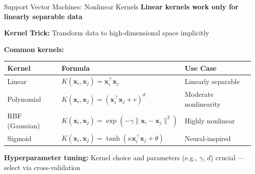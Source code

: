 \documentclass[11pt]{beamer}
\begin{document}
\begin{frame}[fragile]{Support Vector Machines: Nonlinear Kernels}
	\textbf{Linear kernels work only for linearly separable data}

	\vspace{0.2cm}

	\textbf{Kernel Trick:} Transform data to high-dimensional space implicitly \citep[pp. 75]{raschka2019PythonMachineLearning}

	\vspace{0.2cm}

	\textbf{Common kernels:}
	\begin{table}
		\small
		\begin{tabular}{|l|l|l|}
			\hline
			\textbf{Kernel} & \textbf{Formula}                                                                        & \textbf{Use Case}     \\
			\hline
			Linear          & $K(\mathbf{x}_i, \mathbf{x}_j) = \mathbf{x}_i^\top \mathbf{x}_j$                        & Linearly separable    \\
			\hline
			Polynomial      & $K(\mathbf{x}_i, \mathbf{x}_j) = (\mathbf{x}_i^\top \mathbf{x}_j + r)^d$                & Moderate nonlinearity \\
			\hline
			RBF (Gaussian)  & $K(\mathbf{x}_i, \mathbf{x}_j) = \exp(-\gamma \|\mathbf{x}_i - \mathbf{x}_j\|^2)$       & Highly nonlinear      \\
			\hline
			Sigmoid         & $K(\mathbf{x}_i, \mathbf{x}_j) = \tanh(\kappa \mathbf{x}_i^\top \mathbf{x}_j + \theta)$ & Neural-inspired       \\
			\hline
		\end{tabular}
	\end{table}

	\vspace{0.2cm}

	\textbf{Hyperparameter tuning:} Kernel choice and parameters (e.g., $\gamma$, $d$) crucial --- select via cross-validation
\end{frame}
\end{document}
